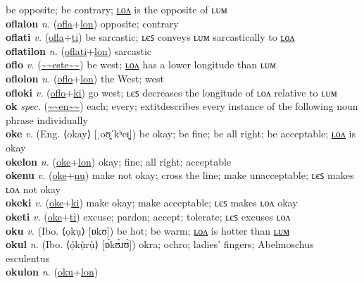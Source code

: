be opposite; be contrary; \hyperref[oflalon]{ʟᴏᴧ} is the opposite of ʟᴜᴍ \label{ofla} \\
\textbf{oflalon} \textit{n.} (\hyperref[ofla]{ofla}+\hyperref[lon]{lon})
opposite; contrary \label{oflalon} \\
\textbf{oflati} \textit{v.} (\hyperref[ofla]{ofla}+\hyperref[ti]{ti})
be sarcastic; ʟєꜱ conveys ʟᴜᴍ sarcastically to \hyperref[oflatilon]{ʟᴏᴧ} \label{oflati} \\
\textbf{oflatilon} \textit{n.} (\hyperref[oflati]{oflati}+\hyperref[lon]{lon})
sarcastic \label{oflatilon} \\
\textbf{oflo} \textit{v.} (\hyperref[este]{\~{}\~{}este\~{}\~{}})
be west; \hyperref[oflolon]{ʟᴏᴧ} has a lower longitude than ʟᴜᴍ \label{oflo} \\
\textbf{oflolon} \textit{n.} (\hyperref[oflo]{oflo}+\hyperref[lon]{lon})
the West; west \label{oflolon} \\
\textbf{ofloki} \textit{v.} (\hyperref[oflo]{oflo}+\hyperref[ki]{ki})
go west; ʟєꜱ decreases the longitude of ʟᴏᴧ relative to ʟᴜᴍ \label{ofloki} \\
\textbf{ok} \textit{spec.} (\hyperref[en]{\~{}\~{}en\~{}\~{}})
each; every; 	extit{describes every instance of the following noun phrase individually} \label{ok} \\
\textbf{oke} \textit{v.} (Eng. ⟨okay⟩ [ˌoʊ̯ˈkʰeɪ̯])
be okay; be fine; be all right; be acceptable; \hyperref[okelon]{ʟᴏᴧ} is okay \label{oke} \\
\textbf{okelon} \textit{n.} (\hyperref[oke]{oke}+\hyperref[lon]{lon})
okay; fine; all right; acceptable \label{okelon} \\
\textbf{okenu} \textit{v.} (\hyperref[oke]{oke}+\hyperref[nu]{nu})
make not okay; cross the line; make unacceptable; ʟєꜱ makes ʟᴏᴧ not okay \label{okenu} \\
\textbf{okeki} \textit{v.} (\hyperref[oke]{oke}+\hyperref[ki]{ki})
make okay; make acceptable; ʟєꜱ makes ʟᴏᴧ okay \label{okeki} \\
\textbf{oketi} \textit{v.} (\hyperref[oke]{oke}+\hyperref[ti]{ti})
excuse; pardon; accept; tolerate; ʟєꜱ excuses ʟᴏᴧ \label{oketi} \\
\textbf{oku} \textit{v.} (Ibo. ⟨ọkụ⟩ [ɒkʊ])
be hot; be warm; \hyperref[okulon]{ʟᴏᴧ} is hotter than \hyperref[okulum]{ʟᴜᴍ} \label{oku} \\
\textbf{okul} \textit{n.} (Ibo. ⟨ọ́kụ̀rụ̀⟩ [ɒ́kʊ̀ɹʊ̀])
okra; ochro; ladies' fingers; Abelmoschus esculentus \label{okul} \\
\textbf{okulon} \textit{n.} (\hyperref[oku]{oku}+\hyperref[lon]{lon})
